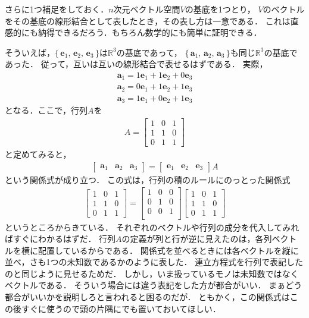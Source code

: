 さらに1つ補足をしておく．$n$次元ベクトル空間$V$の基底を1つとり，
$V$のベクトルをその基底の線形結合として表したとき，その表し方は一意である．
これは直感的にも納得できるだろう．もちろん数学的にも簡単に証明できる．

そういえば，$ \{ \, \bm{e}_1, \, \bm{e}_2, \, \bm{e}_3 \, \} $は$\mathbb{R}^3$の基底であって，
$ \{ \, \bm{a}_1, \, \bm{a}_2, \, \bm{a}_3 \, \} $も同じ$\mathbb{R}^3$の基底であった．
従って，互いは互いの線形結合で表せるはずである．
実際，
\begin{align*}
\bm{a}_1 = 1 \bm{e}_1 + 1 \bm{e}_2 + 0 \bm{e}_3 \\
\bm{a}_2 = 0 \bm{e}_1 + 1 \bm{e}_2 + 1 \bm{e}_3 \\
\bm{a}_3 = 1 \bm{e}_1 + 0 \bm{e}_2 + 1 \bm{e}_3 
\end{align*}
となる．ここで，行列$A$を
\begin{align*}
A= \left[
\begin{array}{ccc}
1 & 0 & 1 \\
1 & 1 & 0 \\
0 & 1 & 1
\end{array}
\right] 
\end{align*}
と定めてみると，
\begin{align}
\left[
\begin{array}{ccc}
\bm{a}_1 & \bm{a}_2 & \bm{a}_3 
\end{array}
\right]
= 
\left[
\begin{array}{ccc}
\bm{e}_1 & \bm{e}_2 & \bm{e}_3
\end{array}
\right]
A
\label{eq:ahenkan}
\end{align}
という関係式が成り立つ．
この式は，行列の積のルールにのっとった関係式
\begin{align*}
\left[
\begin{array}{ccc}
1 & 0 & 1 \\
1 & 1 & 0 \\
0 & 1 & 1 
\end{array}
\right]
= 
\left[
\begin{array}{ccc}
1 & 0 & 0 \\
0 & 1 & 0 \\
0 & 0 & 1 \\
\end{array}
\right]
\left[
\begin{array}{ccc}
1 & 0 & 1 \\
1 & 1 & 0 \\
0 & 1 & 1
\end{array}
\right]
\end{align*}
というところからきている．
それぞれのベクトルや行列の成分を代入してみればすぐにわかるはずだ．
行列$A$の定義が列と行が逆に見えたのは，各列ベクトルを横に配置しているからである．
関係式を並べるときには各ベクトルを縦に並べ，さも1つの未知数であるかのように表した．
連立方程式を行列で表記したのと同じように見せるためだ．
しかし，いま扱っているモノは未知数ではなくベクトルである．
そういう場合には違う表記をした方が都合がいい．
まぁどう都合がいいかを説明しろと言われると困るのだが．
ともかく，この関係式はこの後すぐに使うので頭の片隅にでも置いておいてほしい．
